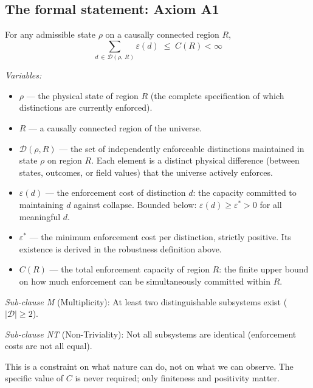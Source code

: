 \documentclass[11pt]{article}
\begin{document}
\subsection{The formal statement: Axiom A1}

\begin{tcolorbox}[apfbox, title={Axiom A1 (Finite Enforcement Capacity)}]
For any admissible state $\rho$ on a causally connected region $R$,
\begin{equation}
\sum_{d \,\in\, \mathcal{D}(\rho,\,R)} \varepsilon(d) \;\le\; C(R) < \infty
\end{equation}

\smallskip\noindent\textit{Variables:}
\begin{itemize}[nosep,leftmargin=2em]
\item $\rho$ --- the physical state of region $R$ (the complete specification of which distinctions are currently enforced).
\item $R$ --- a causally connected region of the universe.
\item $\mathcal{D}(\rho,R)$ --- the set of independently enforceable distinctions maintained in state $\rho$ on region $R$.  Each element is a distinct physical difference (between states, outcomes, or field values) that the universe actively enforces.
\item $\varepsilon(d)$ --- the enforcement cost of distinction $d$: the capacity committed to maintaining $d$ against collapse.  Bounded below: $\varepsilon(d) \ge \varepsilon^* > 0$ for all meaningful $d$.
\item $\varepsilon^*$ --- the minimum enforcement cost per distinction, strictly positive.  Its existence is derived in the robustness definition above.
\item $C(R)$ --- the total enforcement capacity of region $R$: the finite upper bound on how much enforcement can be simultaneously committed within $R$.
\end{itemize}

\medskip
\textit{Sub-clause M} (Multiplicity): At least two distinguishable subsystems exist ($|\mathcal{D}| \ge 2$).

\textit{Sub-clause NT} (Non-Triviality): Not all subsystems are identical (enforcement costs are not all equal).
\end{tcolorbox}

This is a constraint on what nature can do, not on what we can observe.  The specific value of $C$ is never required; only finiteness and positivity matter.
\end{document}

